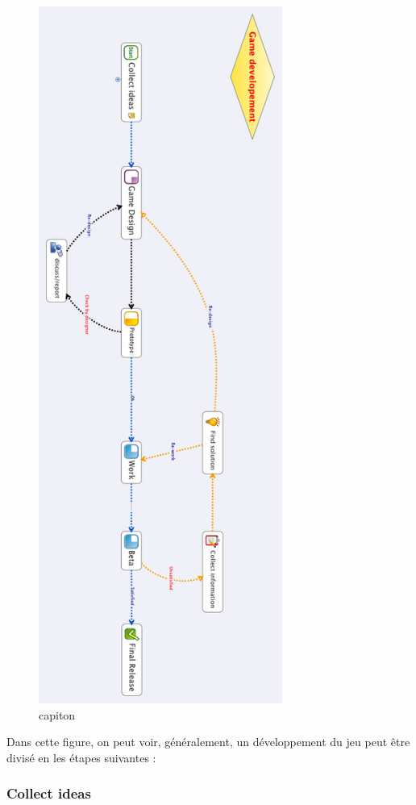 \begin{figure}[htbp]
	\centering
		\includegraphics[height=9in]{XMinds/Gamedevelopement.png}
	\caption{capiton}
	\label{fig:XMinds_Gamedevelopement}
\end{figure}

Dans cette figure, on peut voir, généralement, un développement du jeu peut être divisé en les étapes suivantes :

\subsubsection{Collect ideas} %

